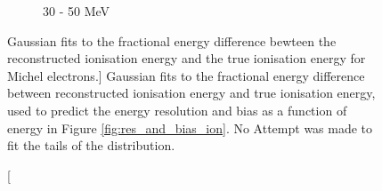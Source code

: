 \begin{figure}
\begin{subfigure}[b]{0.49\textwidth}
		\caption {30 - 50 MeV}
		\label{fig:ion_fit_30}
	\end{subfigure}

	\caption
	[Gaussian fits to the fractional energy difference bewteen the reconstructed
	ionisation energy and the true ionisation energy for Michel electrons.]
	{Gaussian fits to the fractional energy difference between reconstructed 
	ionisation energy and true ionisation energy, used to predict the energy 
	resolution and bias as a function of energy in Figure 
	\ref{fig:res_and_bias_ion}. No Attempt was made to fit the tails of the 
	distribution.}
	\label{fig:ionisation_fits}

\end{figure}

